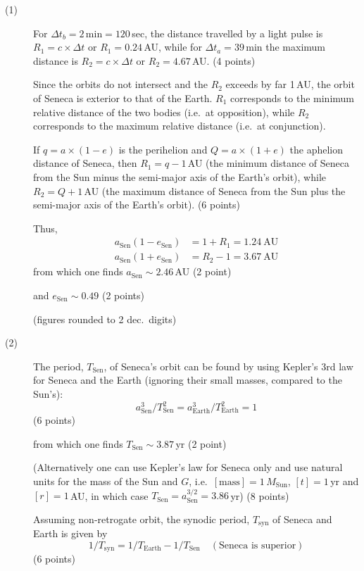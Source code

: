 \begin{description}
\item[(1)] For $\Delta t_b = 2\,\mathrm{min} = 120$\,sec, the distance
  travelled by a light pulse is $R_1 = c \times \Delta t$ or
  $R_1 = 0.24$\,AU, while for $\Delta t_a = 39$\,min the maximum distance is
  $R_2 = c \times \Delta t$ or $R_2 = 4.67$\,AU. \hfill(4 points)

  Since the orbits do not intersect and the $R_2$ exceeds by far 1\,AU, the
  orbit of Seneca is exterior to that of the Earth. $R_1$ corresponds to the
  minimum relative distance of the two bodies (i.e.\ at opposition), while
  $R_2$ corresponds to the maximum relative distance (i.e.\ at conjunction).

  If $q = a\times(1-e)$ is the perihelion and $Q = a\times(1+e)$ the aphelion
  distance of Seneca, then $R_1 = q - 1$\,AU (the minimum distance of Seneca
  from the Sun minus the semi-major axis of the Earth's orbit), while
  $R_2 = Q + 1$\,AU (the maximum distance of Seneca from the Sun plus the
  semi-major axis of the Earth's orbit). \hfill(6 points)

  Thus,
  \begin{align*}
    a_{\mathrm{Sen}}(1 - e_{\mathrm{Sen}}) &= 1 + R_1 = 1.24\ \mathrm{AU} \\
    a_{\mathrm{Sen}}(1 + e_{\mathrm{Sen}}) &= R_2 - 1 = 3.67\ \mathrm{AU}
  \end{align*}
  from which one finds $a_{\mathrm{Sen}} \sim 2.46$\,AU \hfill(2 point)

  and $e_{\mathrm{Sen}} \sim 0.49$ \hfill(2 points)

  (figures rounded to 2 dec.\ digits)

\item[(2)] The period, $T_{\mathrm{Sen}}$, of Seneca's orbit can be found by
  using Kepler's 3rd law for Seneca and the Earth (ignoring their small
  masses, compared to the Sun's):
  \[ a_{\mathrm{Sen}}^{3}/T_{\mathrm{Sen}}^{2}
     = a_{\mathrm{Earth}}^{3}/T_{\mathrm{Earth}}^{2} = 1 \]
  \hfill(6 points)

  from which one finds $T_{\mathrm{Sen}} \sim 3.87$\,yr \hfill(2 point)

  (Alternatively one can use Kepler's law for Seneca only and use natural
  units for the mass of the Sun and $G$, i.e.\ $[\mathrm{mass}] =
  1\,M_{\mathrm{Sun}}$, $[t] = 1$\,yr and $[r] = 1$\,AU, in which case
  $T_{\mathrm{Sen}} = a_{\mathrm{Sen}}^{3/2} = 3.86$\,yr) \hfill(8 points)

  Assuming non-retrogate orbit, %
  the synodic period, $T_{\mathrm{syn}}$ of Seneca and Earth is given by
  \[ 1/T_{\mathrm{syn}} = 1/T_{\mathrm{Earth}} - 1/T_{\mathrm{Sen}}
     \quad (\text{Seneca is superior}) \]
  \hfill(6 points)


\end{description}
